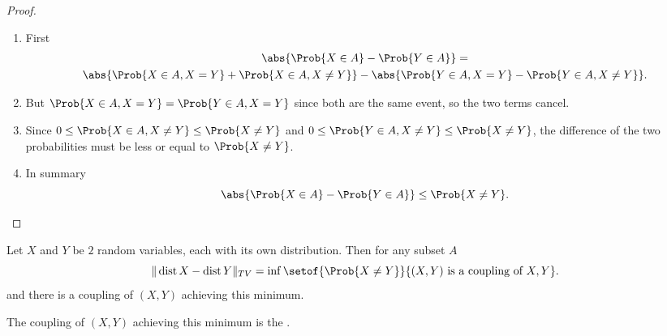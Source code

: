 \documentclass[12pt]{article}
\begin{document}
\begin{proof}
    \begin{enumerate}
        \item
            First
            \begin{multline*}
                \abs{\Prob{X \in A} - \Prob{Y \in A}} = \\
                \abs{\Prob{X \in A, X = Y} + \Prob{X \in A, X \ne Y}} -
                \abs{\Prob{Y \in A, X = Y} - \Prob{Y \in A, X \ne Y}}.
            \end{multline*}
        \item
            But \( \Prob{X \in A, X = Y} = \Prob{Y \in A, X = Y} \)
            since both are the same event, so the two terms cancel.
        \item
            Since \( 0 \le \Prob{X \in A, X \ne Y} \le \Prob{X \ne Y} \)
            and \( 0 \le \Prob{Y \in A, X \ne Y} \le \Prob{X \ne Y} \),
            the difference of the two probabilities must be less or
            equal to \( \Prob{X \ne Y} \).
        \item
            In summary
            \[
                \abs{\Prob{X \in A} - \Prob{Y \in A}} \le \Prob{X \ne Y}.
            \]
    \end{enumerate}
\end{proof}

\begin{proposition}
    Let \( X \) and \( Y \) be \( 2 \) random variables, each with its
    own distribution.  Then for any subset \( A \)
    \[
        \|
        \operatorname{dist}
        {X} -
        \operatorname{dist}
        {Y} \|_{TV} = \inf \setof{\Prob{X \ne Y}}{(X,Y) \text{ is a
        coupling of } X,Y }.
    \] and there is a coupling of \( (X,Y) \) achieving this minimum.
\end{proposition}

\begin{definition}
    The coupling of \( (X,Y) \) achieving this minimum is the .
\end{definition}
\end{document}
